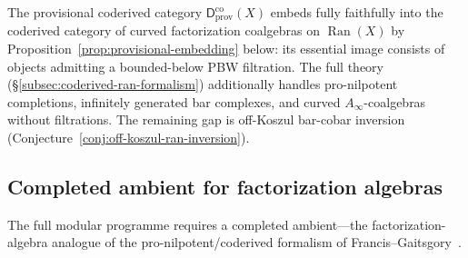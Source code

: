 \begin{remark}
\label{rem:coderived-full}
The provisional coderived category
$\mathsf{D}^{\mathrm{co}}_{\mathrm{prov}}(X)$ embeds fully faithfully
into the coderived category of curved factorization coalgebras on
$\operatorname{Ran}(X)$ by
Proposition~\ref{prop:provisional-embedding} below: its essential
image consists of objects admitting a bounded-below PBW filtration.
The full theory (\S\ref{subsec:coderived-ran-formalism}) additionally
handles pro-nilpotent completions, infinitely generated bar complexes,
and curved $A_\infty$-coalgebras without filtrations.  The remaining
gap is off-Koszul bar-cobar inversion
(Conjecture~\ref{conj:off-koszul-ran-inversion}).
\end{remark}

\subsection{Completed ambient for factorization algebras}
\label{subsec:completed-ambient}

The full modular programme requires a completed ambient---the
factorization-algebra analogue of the pro-nilpotent/coderived
formalism of Francis--Gaitsgory~\cite{FG12}.

